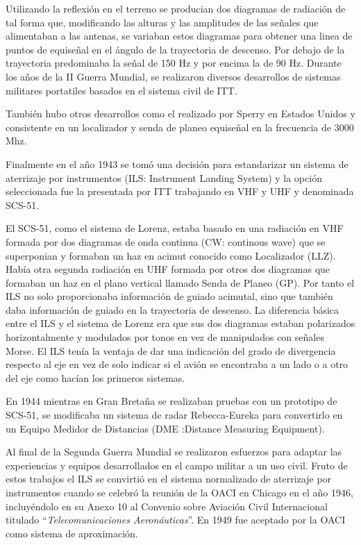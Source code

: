 Utilizando la reflexión en el terreno se producian dos diagramas de radiación de tal forma que,
modificando las alturas y las amplitudes de las señales que alimentaban a las antenas, se variaban
estos diagramas para obtener una linea de puntos de equiseñal en el ángulo de la trayectoria de
descenso. Por debajo de la trayectoria predominaba la señal de 150 Hz y por encima la de 90 Hz.
Durante los años de la II Guerra Mundial, se realizaron diversos desarrollos de sistemas militares
portatiles basados en el sistema civil de ITT.

También hubo otros desarrollos como el realizado por Sperry en Estados Unidos y consistente en
un localizador y senda de planeo equiseñal en la frecuencia de 3000 Mhz.

Finalmente en el año 1943 se tomó una decisión para estandarizar un sistema de aterrizaje por
instrumentos (ILS: Instrument Landing System) y la opción seleccionada fue la presentada por ITT
trabajando en VHF y UHF y denominada SCS-51.

El SCS-51, como el sistema de Lorenz, estaba basado en una radiación en VHF formada por dos
diagramas de onda continua (CW: continous wave) que se superponian y formaban un haz en acimut
conocido como Localizador (LLZ). Había otra segunda radiación en UHF formada por otros dos
diagramas que formaban un haz en el plano vertical llamado Senda de Planeo (GP). Por tanto el ILS
no solo proporcionaba información de guiado acimutal, sino que también daba información de guiado
en la trayectoria de descenso. La diferencia básica entre el ILS y el sistema de Lorenz era que sus dos
diagramas estaban polarizados horizontalmente y modulados por tonos en vez de manipulados con
señales Morse. El ILS tenía la ventaja de dar una indicación del grado de divergencia respecto al eje
en vez de solo indicar si el avión se encontraba a un lado o a otro del eje como hacían los primeros
sistemas.

En 1944 mientras en Gran Bretaña se realizaban pruebas con un prototipo de SCS-51, se modificaba un sistema de radar Rebecca-Eureka para convertirlo en un Equipo Medidor de Distancias
(DME :Distance Measuring Equipment).

Al final de la Segunda Guerra Mundial se realizaron esfuerzos para adaptar las experiencias y equipos
desarrollados en el campo militar a un uso civil. Fruto de estos trabajos el ILS se convirtió en el
sistema normalizado de aterrizaje por instrumentos cuando se celebró la reunión de la OACI en Chicago en el año 1946, incluyéndolo en su Anexo 10 al Convenio sobre Aviación Civil Internacional titulado ``\emph{Telecomunicaciones Aeronáuticas}''. En 1949
fue aceptado por la OACI como sistema de aproximación.


